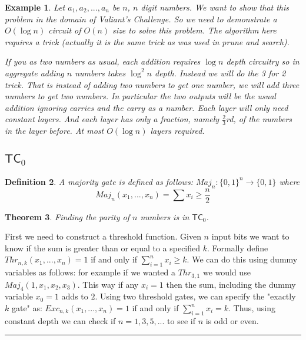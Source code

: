 \documentclass[twoside]{article}
\newcounter{lecnum}
\newtheorem{theorem}{Theorem}[lecnum]
\newtheorem{definition}[theorem]{Definition}
\newtheorem{example}[theorem]{Example}
\newenvironment{proof}{{\bf Proof:}}{\hfill\rule{2mm}{2mm}}
\def\TC{\mathsf{TC}}
\begin{document}
\begin{example}
Let $a_1, a_2, ..., a_n$ be $n$, $n$ digit numbers. We want to show that this problem in the domain of Valiant's Challenge. So we need to demonstrate a $O(\log n)$ circuit of $O(n)$ size to solve this problem. The algorithm here requires a trick (actually it is the same trick as was used in prune and search). 

If you as two numbers as usual, each addition requires $\log n$ depth circuitry so in aggregate adding $n$ numbers takes $\log^2 n$ depth. Instead we will do the \emph{3 for 2} trick. That is instead of adding two numbers to get one number, we will add three numbers to get two numbers. In particular the two outputs will be the usual addition ignoring carries and the carry as a number. Each layer will only need constant layers. And each layer has only a fraction, namely $\frac{2}{3}$rd, of the numbers in the layer before. At most $O(\log n)$ layers required.       
\end{example}

\subsection{$\TC_0$}

\begin{definition}
A majority gate is defined as follows: $Maj_n: \{0,1\}^n \rightarrow \{0,1\}$ where 
\[Maj_n(x_1, ..., x_n) = \sum x_i \geq \frac{n}{2}\]
\end{definition}

\begin{theorem}
Finding the parity of $n$ numbers is in $\TC_0$. 
\end{theorem}
\begin{proof}
First we need to construct a threshold function. Given $n$ input bits we want to know if the sum is greater than or equal to a specified $k$. Formally define $Thr_{n,k}(x_1, ..., x_n) = 1$ if and only if $\sum_{i=1}^{n} x_i \geq k$. We can do this using dummy variables as follows: for example if we wanted a $Thr_{3,1}$ we would use $Maj_4(1, x_1, x_2, x_3)$. This way if any $x_i = 1$ then the sum, including the dummy variable $x_0 = 1$ adds to $2$. Using two threshold gates, we can specify the "exactly $k$ gate" as: $Exc_{n,k}(x_1, ..., x_n) = 1$ if and only if $\sum_{i=1}^{n} x_i = k$. Thus, using constant depth we can check if $n = 1, 3, 5, ...$ to see if $n$ is odd or even.
\end{proof}
\end{document}
